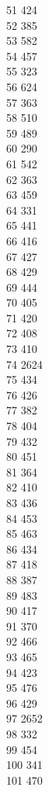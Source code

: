 { 51	424 \\
 52	385 \\
 53	582 \\
 54	457 \\
 55	323 \\
 56	624 \\
 57	363 \\
 58	510 \\
 59	489 \\
 60	290 \\
 61	542 \\
 62	363 \\
 63	459 \\
 64	331 \\
 65	441 \\
 66	416 \\
 67	427 \\
 68	429 \\
 69	444 \\
 70	405 \\
 71	420 \\
 72	408 \\
 73	410 \\
 74	2624 \\
 75	434 \\
 76	426 \\
 77	382 \\
 78	404 \\
 79	432 \\
 80	451 \\
 81	364 \\
 82	410 \\
 83	436 \\
 84	453 \\
 85	463 \\
 86	434 \\
 87	418 \\
 88	387 \\
 89	483 \\
 90	417 \\
 91	370 \\
 92	466 \\
 93	465 \\
 94	423 \\
 95	476 \\
 96	429 \\
 97	2652 \\
 98	332 \\
 99	454 \\
 100	341 \\
 101	470 \\
}
